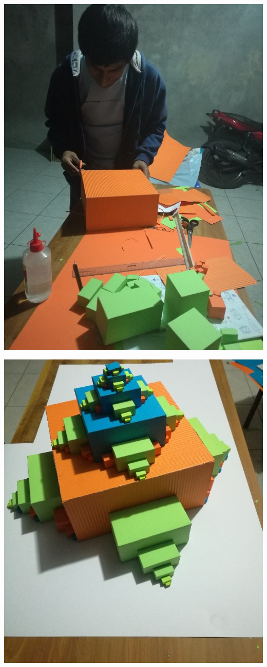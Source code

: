 \documentclass[12pt,]{report}
\begin{document}
\includegraphics{ff1.jpg}

\includegraphics{ff2.jpg}
\end{document}
